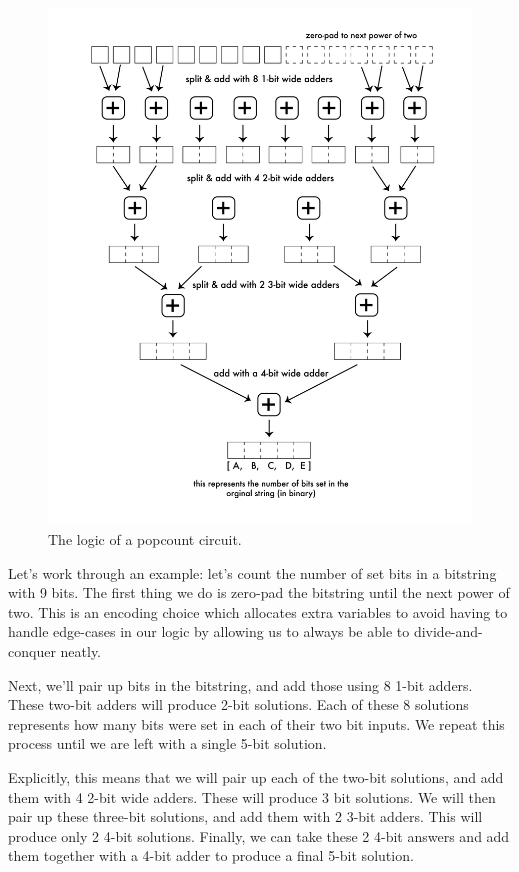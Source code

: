 \begin{figure}[t]
    \centerline{\includegraphics[origin=c,width=12cm]{fig_popcount}}
    \caption{The logic of a popcount circuit.}%
    \label{fig:popcount}%
\end{figure}

Let's work through an example: let's count the number of set bits in a bitstring with 9 bits. The first thing we do is zero-pad the bitstring until the next power of two. This is an encoding choice which allocates extra variables to avoid having to handle edge-cases in our logic by allowing us to always be able to divide-and-conquer neatly.

Next, we'll pair up bits in the bitstring, and add those using 8 1-bit adders. These two-bit adders will produce 2-bit solutions. Each of these 8 solutions represents how many bits were set in each of their two bit inputs. We repeat this process until we are left with a single 5-bit solution.

Explicitly, this means that we will pair up each of the two-bit solutions, and add them with 4 2-bit wide adders. These will produce 3 bit solutions. We will then pair up these three-bit solutions, and add them with 2 3-bit adders. This will produce only 2 4-bit solutions. Finally, we can take these 2 4-bit answers and add them together with a 4-bit adder to produce a final 5-bit solution.

